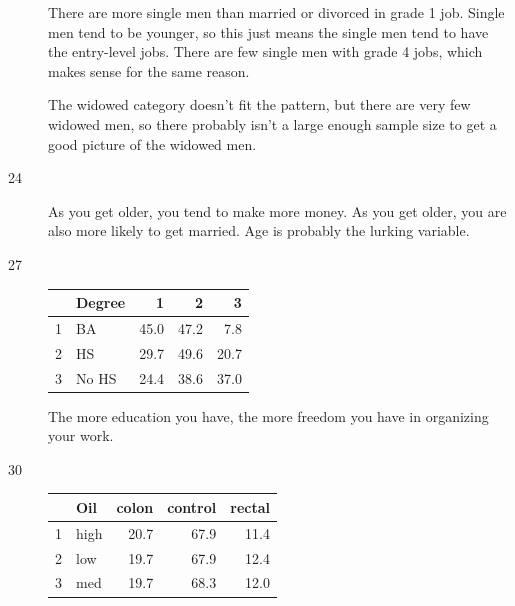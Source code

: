 \documentclass[letterpaper, landscape]{exam}
\begin{document}
\begin{description}
\begin{parts}
          There are more single men than married or divorced in grade 1 job.  
          Single men tend to be younger, so this just means the single men tend to
          have the entry-level jobs.  There are few single men with grade 4 jobs,
          which makes sense for the same reason.

          The widowed category doesn't fit the pattern, but there are very few
          widowed men, so there probably isn't a large enough sample size to get a
          good picture of the widowed men.

      \end{parts}

    \item[24] As you get older, you tend to make more money.  As you get older, you
      are also more likely to get married.  Age is probably the lurking variable.

    \item[27]
      \begin{table}[H]
        \centering
        \begin{tabular}{rlrrr}
          \toprule
            & Degree & 1    & 2    & 3     \\
          \midrule
          1 & BA     & 45.0 & 47.2 & 7.8  \\
          2 & HS     & 29.7 & 49.6 & 20.7 \\
          3 & No HS  & 24.4 & 38.6 & 37.0 \\
          \bottomrule
        \end{tabular}
      \end{table}

      The more education you have, the more freedom you have in organizing your work.

    \item[30]
      \begin{table}[H]
        \centering
        \begin{tabular}{rlrrr}
          \toprule
            & Oil  & colon & control & rectal \\
          \midrule
          1 & high & 20.7  & 67.9    & 11.4 \\
          2 & low  & 19.7  & 67.9    & 12.4 \\
          3 & med  & 19.7  & 68.3    & 12.0 \\
          \bottomrule
        \end{tabular}
      \end{table}


\end{description}
\end{document}
